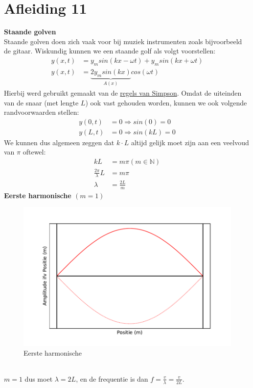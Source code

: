 \documentclass[a4paper,kul]{kulakarticle} %
\begin{document}
\section{Afleiding 11}
\textbf{Staande golven}\\
Staande golven doen zich vaak voor bij muziek instrumenten zoals bijvoorbeeld de gitaar. Wiskundig kunnen we een staande golf als volgt voorstellen:
\begin{align*}
	y(x,t) &=y_msin(kx-\omega t)+y_msin(kx+\omega t)\\
	y(x,t) &=\underbrace{2y_msin(kx)}_{A(x)}cos(\omega t)
\end{align*}
Hierbij werd gebruikt gemaakt van de \href{https://nl.wikipedia.org/wiki/Lijst_van_goniometrische_gelijkheden#Som-naar-product-identiteiten_(regels_van_Simpson)}{regels van Simpson}. Omdat de uiteinden van de snaar (met lengte $L$) ook vast gehouden worden, kunnen we ook volgende randvoorwaarden stellen:
\begin{align*}
	y(0,t)  &= 0 \Rightarrow sin(0)=0\\
	y(L,t) &= 0 \Rightarrow sin(kL)=0
\end{align*}
We kunnen dus algemeen zeggen dat $k\cdot L$ altijd gelijk moet zijn aan een veelvoud van $\pi$ oftewel:
\begin{align*}
	kL & = m\pi (m\in\mathbb{N})\\
	\frac{2\pi}{\lambda}L &=m\pi\\
	\lambda & = \frac{2L}{m}
\end{align*}
\textbf{Eerste harmonische $(m = 1)$}\\
\begin{figure}[h]
	\centering
	\includegraphics[width=0.7\linewidth]{Eerste_harm}
	\caption[Eerste harmonische]{Eerste harmonische}
	\label{fig:eersteharm}
\end{figure}\\
$m = 1$ dus moet $\lambda = 2L$, en de frequentie is dan $f = \frac{v}{\lambda} = \frac{v}{2L}$.\\
\end{document}
